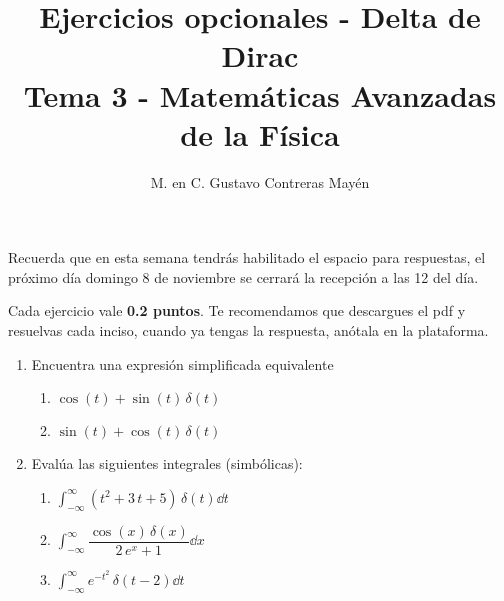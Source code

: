 
\usepackage{apacite}
\title{Ejercicios opcionales - Delta de Dirac\\[0.3em]  \large{Tema 3 - Matemáticas Avanzadas de la Física}\vspace{-3ex}}
\author{M. en C. Gustavo Contreras Mayén}
\date{ }

\vspace{-4cm}
\maketitle
\fontsize{14}{14}\selectfont
Recuerda que en esta semana tendrás habilitado el espacio para respuestas, el próximo día domingo 8 de noviembre se cerrará la recepción a las 12 del día.
\par
Cada ejercicio vale \textbf{0.2 puntos}. Te recomendamos que descargues el pdf y resuelvas cada inciso, cuando ya tengas la respuesta, anótala en la plataforma.

\begin{enumerate}
\item Encuentra una expresión simplificada equivalente 
\begin{enumerate}
\item $\cos (t) + \sin (t) \, \delta(t)$
\item $\sin (t) + \cos (t) \, \delta(t)$
\end{enumerate}
\item Evalúa las siguientes integrales (simbólicas):
\begin{enumerate}
\item $\displaystyle\int_{-\infty}^{\infty} (t^{2} + 3 \, t + 5) \, \delta(t) \dd{t}$
\item $\displaystyle\int_{-\infty}^{\infty} \dfrac{\cos(x) \, \delta(x)}{2 \, e^{x} + 1} \dd{x}$
\item $\displaystyle\int_{-\infty}^{\infty} e^{-t^{2}}  \, \delta(t - 2) \dd{t}$
\end{enumerate}
\end{enumerate}


